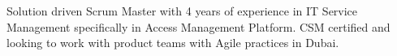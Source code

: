 

\begin{cvparagraph}

Solution driven Scrum Master with 4 years of experience in IT Service Management specifically in Access Management Platform. CSM certified and looking to work with product teams with Agile practices in Dubai.
\end{cvparagraph}

